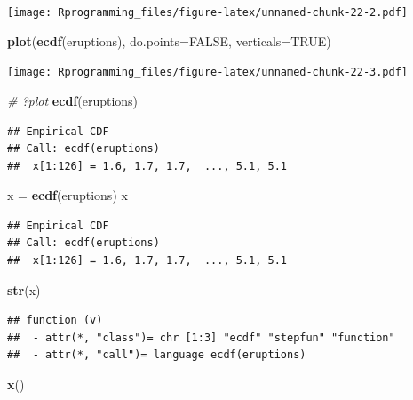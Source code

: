 \documentclass[10pt,]{krantz}
\makeatletter
\newenvironment{Shaded}{\begin{snugshade}}{\end{snugshade}}
\newcommand{\KeywordTok}[1]{\textcolor[rgb]{0.13,0.29,0.53}{\textbf{#1}}}
\newcommand{\DataTypeTok}[1]{\textcolor[rgb]{0.13,0.29,0.53}{#1}}
\newcommand{\StringTok}[1]{\textcolor[rgb]{0.31,0.60,0.02}{#1}}
\newcommand{\CommentTok}[1]{\textcolor[rgb]{0.56,0.35,0.01}{\textit{#1}}}
\newcommand{\OtherTok}[1]{\textcolor[rgb]{0.56,0.35,0.01}{#1}}
\newcommand{\NormalTok}[1]{#1}
\newenvironment{kframe}{%
\medskip{}
\setlength{\fboxsep}{.8em}
 \def\at@end@of@kframe{}%
 \ifinner\ifhmode%
  \def\at@end@of@kframe{\end{minipage}}%
  \begin{minipage}{\columnwidth}%
 \fi\fi%
 \def\FrameCommand##1{\hskip\@totalleftmargin \hskip-\fboxsep
 \colorbox{shadecolor}{##1}\hskip-\fboxsep
     \hskip-\linewidth \hskip-\@totalleftmargin \hskip\columnwidth}%
 \MakeFramed {\advance\hsize-\width
   \@totalleftmargin\z@ \linewidth\hsize
   \@setminipage}}%
 {\par\unskip\endMakeFramed%
 \at@end@of@kframe}
\renewenvironment{Shaded}{\begin{kframe}}{\end{kframe}}
\makeatother
\begin{document}
\texttt{[image: Rprogramming\_files/figure-latex/unnamed-chunk-22-2.pdf]}

\begin{Shaded}
\begin{Highlighting}[]
\KeywordTok{plot}\NormalTok{(}\KeywordTok{ecdf}\NormalTok{(eruptions), }\DataTypeTok{do.points=}\OtherTok{FALSE}\NormalTok{, }\DataTypeTok{verticals=}\OtherTok{TRUE}\NormalTok{)}
\end{Highlighting}
\end{Shaded}

\texttt{[image: Rprogramming\_files/figure-latex/unnamed-chunk-22-3.pdf]}

\begin{Shaded}
\begin{Highlighting}[]
\CommentTok{# ?plot}
\KeywordTok{ecdf}\NormalTok{(eruptions)}
\end{Highlighting}
\end{Shaded}

\begin{verbatim}
## Empirical CDF 
## Call: ecdf(eruptions)
##  x[1:126] = 1.6, 1.7, 1.7,  ..., 5.1, 5.1
\end{verbatim}

\begin{Shaded}
\begin{Highlighting}[]
\NormalTok{x =}\StringTok{ }\KeywordTok{ecdf}\NormalTok{(eruptions)}
\NormalTok{x}
\end{Highlighting}
\end{Shaded}

\begin{verbatim}
## Empirical CDF 
## Call: ecdf(eruptions)
##  x[1:126] = 1.6, 1.7, 1.7,  ..., 5.1, 5.1
\end{verbatim}

\begin{Shaded}
\begin{Highlighting}[]
\KeywordTok{str}\NormalTok{(x)}
\end{Highlighting}
\end{Shaded}

\begin{verbatim}
## function (v)  
##  - attr(*, "class")= chr [1:3] "ecdf" "stepfun" "function"
##  - attr(*, "call")= language ecdf(eruptions)
\end{verbatim}

\begin{Shaded}
\begin{Highlighting}[]
\KeywordTok{x}\NormalTok{()}
\end{Highlighting}
\end{Shaded}
\end{document}
